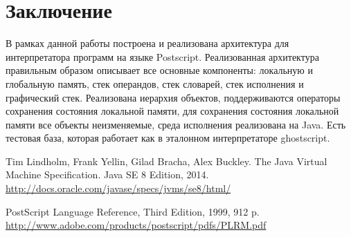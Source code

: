 \section*{Заключение}

В рамках данной работы построена и реализована архитектура для интерпретатора программ на языке Postscript. Реализованная архитектура правильным образом описывает все основные компоненты: локальную и глобальную память, стек операндов, стек словарей, стек исполнения и графический стек. Реализована иерархия объектов, поддерживаются операторы сохранения состояния локальной памяти, для сохранения состояния локальной памяти все объекты неизменяемые, среда исполнения реализована на Java. Есть тестовая база, которая работает как в эталонном интерпретаторе ghostscript.

\begin{thebibliography}{99}
Tim Lindholm, Frank Yellin, Gilad Bracha, Alex Buckley.
The Java Virtual Machine Specification.
Java SE 8 Edition, 2014. \\
\url{http://docs.oracle.com/javase/specs/jvms/se8/html/}

PostScript Language Reference, Third Edition, 1999, 912 p. \\
\url{http://www.adobe.com/products/postscript/pdfs/PLRM.pdf}
\end{thebibliography}
